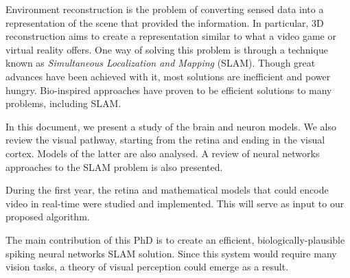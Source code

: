 Environment reconstruction is the problem of converting sensed data into a representation of the scene that provided the information. In particular, 3D reconstruction aims to create a representation similar to what a video game or virtual reality offers. One way of solving this problem is through a technique known as \emph{Simultaneous Localization and Mapping} (SLAM). Though great advances have been achieved with it, most solutions are inefficient and power hungry. Bio-inspired approaches have proven to be efficient solutions to many problems, including SLAM. 

In this document, we present a study of the brain and neuron models. We also review the visual pathway, starting from the retina and ending in the visual cortex. Models of the latter are also analysed. A review of neural networks approaches to the SLAM problem is also presented.

During the first year, the retina and mathematical models that could encode video in real-time were studied and implemented. This will serve as input to our proposed algorithm.

The main contribution of this PhD is to create an efficient, biologically-plausible spiking neural networks SLAM solution. Since this system would require many vision tasks, a theory of visual perception could emerge as a result.
